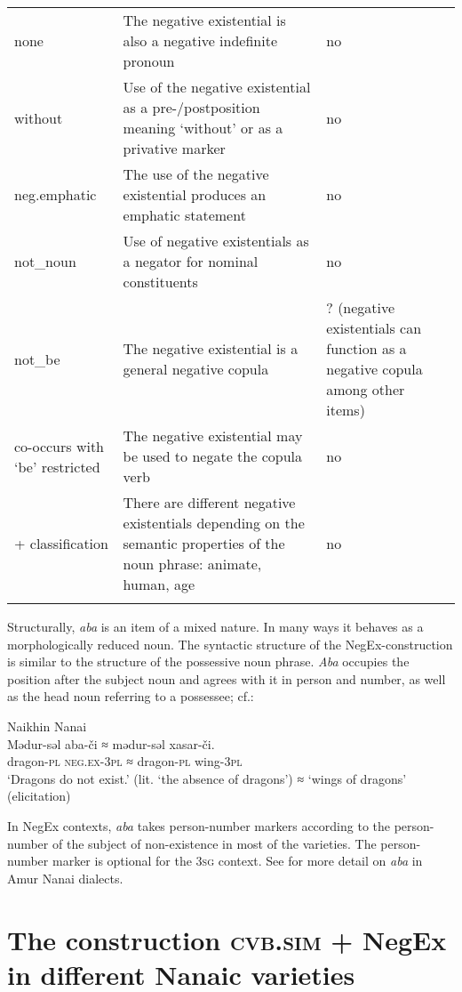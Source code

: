 \documentclass[output=paper,colorlinks,citecolor=brown]{langscibook}
\begin{document}
\begin{table}
\begin{tabularx}{\textwidth}{p{3cm}Qp{2cm}}
        none & The negative existential is also a negative indefinite pronoun & no \\
        without & Use of the negative existential as a pre-/postposition meaning ‘without’ or as a privative marker & no \\
        neg.emphatic & The use of the negative existential produces an emphatic statement & no \\
        not\_noun & Use of negative existentials as a negator for nominal constituents & no \\
        not\_be & The negative existential is a general negative copula & ? (negative existentials can function as a negative copula among other items) \\
        co-occurs with ‘be’ restricted & The negative existential may be used to negate the copula verb & no \\
        + classification & There are different negative existentials depending on the semantic properties of the noun phrase: animate, human, age & no \\ \lspbottomrule
    \end{tabularx}
    \end{table}

Structurally, \textit{aba} is an item of a mixed nature. In many ways it behaves as a morphologically reduced noun. The syntactic structure of the NegEx-construction is similar to the structure of the possessive noun phrase. \textit{Aba} occupies the position after the subject noun and agrees with it in person and number, as well as the head noun referring to a possessee; cf.:

\ea Naikhin Nanai \label{ex:T8}\\
	\gll Mədur-səl	aba-či	≈	mədur-səl	xasar-či.\\
	dragon-\textsc{pl}	\textsc{neg.ex-3pl}	≈	dragon-\textsc{pl}	wing-\textsc{3pl}\\
	\glt `Dragons do not exist.' (lit. `the absence of dragons') ≈ `wings of dragons' (elicitation)
\z


In NegEx contexts, \textit{aba} takes person-number markers according to the person-number of the subject of non-existence in most of the varieties. The person-number marker is optional for the \textsc{3sg} context. See \citet{oskolskaya2015a} for more detail on \textit{aba} in Amur Nanai dialects.

\section{The construction \textsc{cvb.sim} + NegEx in different Nanaic varieties}\label{sec:T5}
\end{document}
